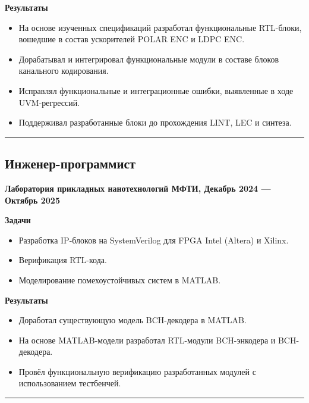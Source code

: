 \documentclass[10pt, a4paper]{article}
\begin{document}
\textbf{Результаты}

\begin{itemize}
    \item На основе изученных спецификаций разработал функциональные RTL-блоки, вошедшие в состав ускорителей POLAR ENC и LDPC ENC.
    \item Дорабатывал и интегрировал функциональные модули в составе блоков канального кодирования.
    \item Исправлял функциональные и интеграционные ошибки, выявленные в ходе UVM-регрессий.
    \item Поддерживал разработанные блоки до прохождения LINT, LEC и синтеза.
\end{itemize}

\rule{\linewidth}{1pt}


\subsection*{Инженер-программист}

\textbf{Лаборатория прикладных нанотехнологий МФТИ, Декабрь 2024 --- Октябрь 2025}

\textbf{Задачи}

\begin{itemize}
    \item Разработка IP-блоков на SystemVerilog для FPGA Intel (Altera) и Xilinx.
    \item Верификация RTL-кода.
    \item Моделирование помехоустойчивых систем в MATLAB.
\end{itemize}

\textbf{Результаты}

\begin{itemize}
    \item Доработал существующую модель BCH-декодера в MATLAB.
    \item На основе MATLAB-модели разработал RTL-модули BCH-энкодера и BCH-декодера.
    \item Провёл функциональную верификацию разработанных модулей с использованием тестбенчей.
\end{itemize}

\rule{\linewidth}{1pt}

\end{document}
